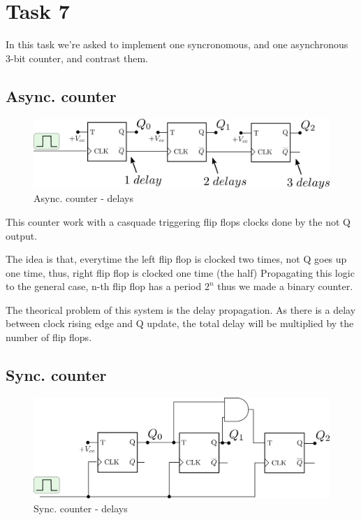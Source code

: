 \newpage

\section*{Task 7}

In this task we're asked to implement one syncronomous, and one asynchronous 3-bit counter, and contrast them.

\subsection*{Async. counter}
\begin{figure}[H]
    \begin{centering}
    \includegraphics[width=1\textwidth]{data/async.png}
    \par\end{centering}
    \caption{Async. counter - delays}
\end{figure}


This counter work with a casquade triggering flip flops clocks done by the not Q output.

The idea is that, everytime the left flip flop is clocked two times, not Q goes up one time, thus, right flip flop is clocked one time (the half)
Propagating this logic to the general case, n-th flip flop has a period $2^n$ thus we made a binary counter. 

The theorical problem of this system is the delay propagation. As there is a delay between clock rising edge and Q update, the total delay will be multiplied by the number of flip flops.

\subsection*{Sync. counter}
\begin{figure}[H]
    \begin{centering}
    \includegraphics[width=1\textwidth]{data/sync.png}
    \par\end{centering}
    \caption{Sync. counter - delays}
\end{figure}


